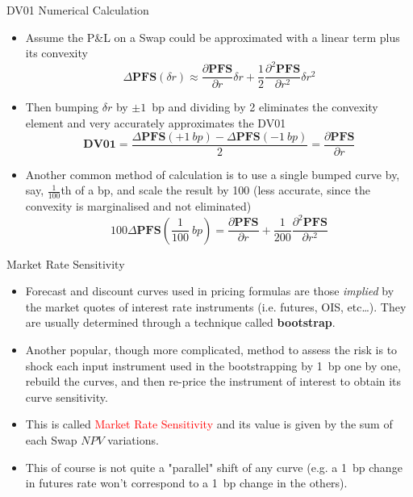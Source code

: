 \documentclass{beamer}
\begin{document}
\begin{frame}{DV01 Numerical Calculation}
\begin{itemize}
	\item<1-> Assume the P\&L on a Swap could be approximated with a linear term plus its convexity
	\begin{equation*}
	\Delta \textbf{PFS}(\delta r)\approx \frac{\partial \textbf{PFS} }{\partial r}\delta r + \frac{1}{2}\frac{\partial^2 \textbf{PFS}}{\partial r^2}\delta r^2
	\end{equation*}
	\item<2-> Then bumping $\delta r$ by $\pm 1$~bp and dividing by 2 eliminates the convexity element and very accurately approximates the DV01
	\begin{equation*}
	\textbf{DV01} = \frac{\Delta \textbf{PFS}(+1~bp)-\Delta \textbf{PFS}(-1~bp)}{2}=\frac{\partial \textbf{PFS} }{\partial r}
	\end{equation*}
	\item<3-> Another common method of calculation is to use a single bumped curve by, say, $\frac{1}{100}$th of a bp, and scale the result by 100 (less accurate, since the convexity is marginalised and not eliminated)
	\begin{equation*}
	100\Delta \textbf{PFS}\left(\frac{1}{100}~bp\right)=\frac{\partial \textbf{PFS}}{\partial r}+\frac{1}{200}\frac{\partial^2\textbf{PFS}}{\partial r^2}
	\end{equation*}
	\end{itemize}
\end{frame}

\begin{frame}{Market Rate Sensitivity}
\begin{itemize}
	\item<1-> Forecast and discount curves used in pricing formulas are those \emph{implied} by the market quotes of interest rate instruments (i.e. futures, OIS, etc\ldots). They are usually determined through a technique called \textbf{bootstrap}.
	\item<2-> Another popular, though more complicated, method to assess the risk is to shock each input instrument used in the bootstrapping by 1~bp one by one, rebuild the curves, and then re-price the instrument of interest to obtain its curve sensitivity. 
	\item<3-> This is called \textcolor{red}{Market Rate Sensitivity} and its value is given by the sum of each Swap $NPV$ variations.
	\item<4-> This of course is not quite a "parallel" shift of any curve (e.g. a 1~bp change in futures rate won't correspond to a 1~bp change in the others).
\end{itemize}
\end{frame}
\end{document}
